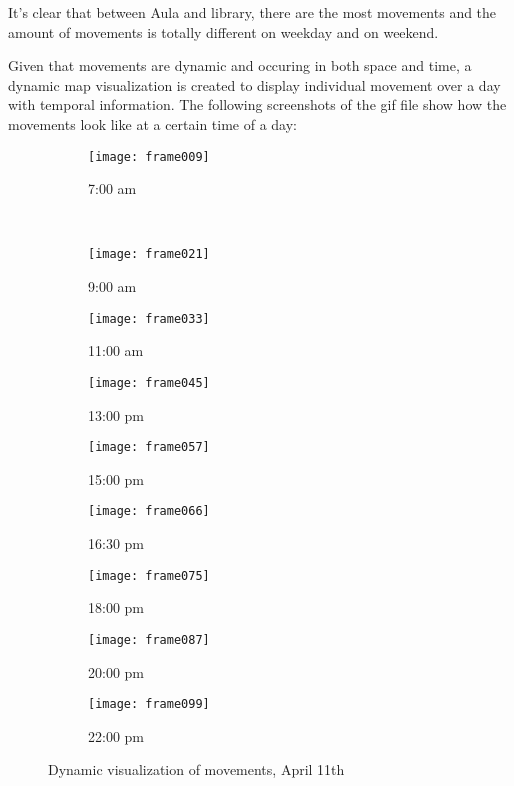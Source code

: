 It's clear that between Aula and library, there are the most movements and the amount of movements is totally different on weekday and on weekend.

Given that movements are dynamic and occuring in both space and time, a dynamic map visualization is created to display individual movement over a day with temporal information. The following screenshots of the gif file show how the movements look like at a certain time of a day:

\begin{figure}[H]
\captionsetup[subfigure]{justification=centering}
    \centering
    \begin{subfigure}[t]{0.3\textwidth}
        \centering
        \texttt{[image: frame009]}
        \caption{7:00 am}
    \end{subfigure}%
    ~ 
    \begin{subfigure}[t]{0.3\textwidth}
        \centering
        \texttt{[image: frame021]}
        \caption{9:00 am}
    \end{subfigure}
    \begin{subfigure}[t]{0.3\textwidth}
        \centering
        \texttt{[image: frame033]}
        \caption{11:00 am}
    \end{subfigure}
    \begin{subfigure}[t]{0.3\textwidth}
        \centering
        \texttt{[image: frame045]}
        \caption{13:00 pm}
    \end{subfigure}
    \begin{subfigure}[t]{0.3\textwidth}
        \centering
        \texttt{[image: frame057]}
        \caption{15:00 pm}
    \end{subfigure}
    \begin{subfigure}[t]{0.3\textwidth}
        \centering
        \texttt{[image: frame066]}
        \caption{16:30 pm}
    \end{subfigure}
    \begin{subfigure}[t]{0.3\textwidth}
        \centering
        \texttt{[image: frame075]}
        \caption{18:00 pm}
    \end{subfigure}
    \begin{subfigure}[t]{0.3\textwidth}
        \centering
        \texttt{[image: frame087]}
        \caption{20:00 pm}
    \end{subfigure}
    \begin{subfigure}[t]{0.3\textwidth}
        \centering
        \texttt{[image: frame099]}
        \caption{22:00 pm}
    \end{subfigure}

    \captionsetup{justification=centering}
    \caption{Dynamic visualization of movements, April 11th}
    \label{autovisualization}
\end{figure}

